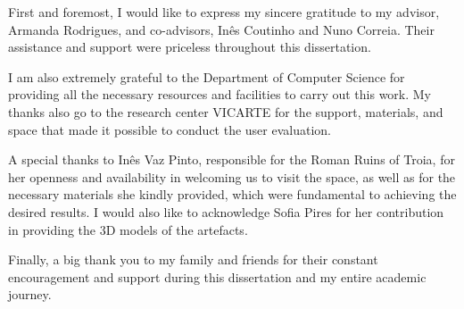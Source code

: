 
%

\begin{ntacknowledgements}

First and foremost, I would like to express my sincere gratitude to my advisor, Armanda Rodrigues, and co-advisors, Inês Coutinho and Nuno Correia. Their assistance and support were priceless throughout this dissertation.

I am also extremely grateful to the Department of Computer Science for providing all the necessary resources and facilities to carry out this work. My thanks also go to the research center VICARTE for the support, materials, and space that made it possible to conduct the user evaluation.

A special thanks to Inês Vaz Pinto, responsible for the Roman Ruins of Troia, for her openness and availability in welcoming us to visit the space, as well as for the necessary materials she kindly provided, which were fundamental to achieving the desired results.
I would also like to acknowledge Sofia Pires for her contribution in providing the 3D models of the artefacts.

Finally, a big thank you to my family and friends for their constant encouragement and support during this dissertation and my entire academic journey.

\end{ntacknowledgements}